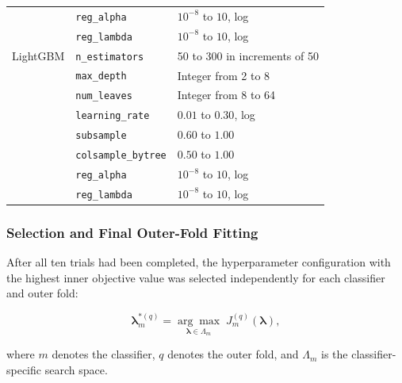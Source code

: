 \documentclass[12pt,twocolumn]{article}
\begin{document}
\begin{table}[htbp]
\begin{tabularx}{\textwidth}{p{3.0cm} p{3.4cm} X}
& \texttt{reg\_alpha}
& \(10^{-8}\) to \(10\), log \\

& \texttt{reg\_lambda}
& \(10^{-8}\) to \(10\), log \\

\midrule

LightGBM
& \texttt{n\_estimators}
& 50 to 300 in increments of 50 \\

& \texttt{max\_depth}
& Integer from 2 to 8 \\

& \texttt{num\_leaves}
& Integer from 8 to 64 \\

& \texttt{learning\_rate}
& \(0.01\) to \(0.30\), log \\

& \texttt{subsample}
& \(0.60\) to \(1.00\) \\

& \texttt{colsample\_bytree}
& \(0.50\) to \(1.00\) \\

& \texttt{reg\_alpha}
& \(10^{-8}\) to \(10\), log \\

& \texttt{reg\_lambda}
& \(10^{-8}\) to \(10\), log \\

\bottomrule
\end{tabularx}
\end{table}







\subsubsection{Selection and Final Outer-Fold Fitting}
\label{subsubsec:final_hyperparameter_selection}

After all ten trials had been completed, the hyperparameter
configuration with the highest inner objective value was selected
independently for each classifier and outer fold:

\begin{equation}
\boldsymbol{\lambda}^{*(q)}_m
=
\underset{\boldsymbol{\lambda}\in\Lambda_m}
{\arg\max}
\;
J^{(q)}_m
\left(
\boldsymbol{\lambda}
\right),
\label{eq:best_hyperparameters}
\end{equation}

where \(m\) denotes the classifier, \(q\) denotes the outer fold, and
\(\Lambda_m\) is the classifier-specific search space.
\end{document}
